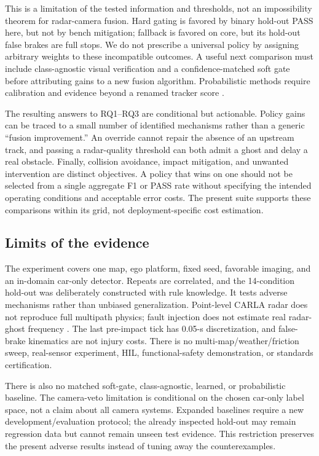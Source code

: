 \documentclass[conference]{IEEEtran}
\begin{document}
This is a limitation of the tested information and thresholds, not an
impossibility theorem for radar-camera fusion. Hard gating is favored by binary
hold-out PASS here, but not by bench mitigation; fallback is favored on core,
but its hold-out false brakes are full stops. We do not prescribe a universal
policy by assigning arbitrary weights to these incompatible outcomes. A useful
next comparison must include class-agnostic visual verification and a
confidence-matched soft gate before attributing gains to a new fusion algorithm.
Probabilistic methods require calibration and evidence beyond a renamed tracker
score \cite{sandblom2011threat,lindenmaier2022existence}.

The resulting answers to RQ1--RQ3 are conditional but actionable. Policy gains
can be traced to a small number of identified mechanisms rather than a generic
``fusion improvement.'' An override cannot repair the absence of an upstream
track, and passing a radar-quality threshold can both admit a ghost and delay a
real obstacle. Finally, collision avoidance, impact mitigation, and unwanted
intervention are distinct objectives. A policy that wins on one should not be
selected from a single aggregate F1 or PASS rate without specifying the intended
operating conditions and acceptable error costs. The present suite supports
these comparisons within its grid, not deployment-specific cost estimation.

\subsection{Limits of the evidence}
The experiment covers one map, ego platform, fixed seed, favorable imaging,
and an in-domain car-only detector. Repeats are correlated, and the 14-condition
hold-out was deliberately constructed with rule knowledge. It tests adverse
mechanisms rather than unbiased generalization. Point-level CARLA radar does
not reproduce full multipath physics; fault injection does not estimate real
radar-ghost frequency \cite{kraus2021ghost,magosi2022radar}. The last pre-impact
tick has 0.05-s discretization, and false-brake kinematics are not injury costs.
There is no multi-map/weather/friction sweep, real-sensor experiment, HIL,
functional-safety demonstration, or standards certification.

There is also no matched soft-gate, class-agnostic, learned, or probabilistic
baseline. The camera-veto limitation is conditional on the chosen car-only
label space, not a claim about all camera systems. Expanded baselines require a
new development/evaluation protocol; the already inspected hold-out may remain
regression data but cannot remain unseen test evidence. This restriction
preserves the present adverse results instead of tuning away the counterexamples.
\end{document}
